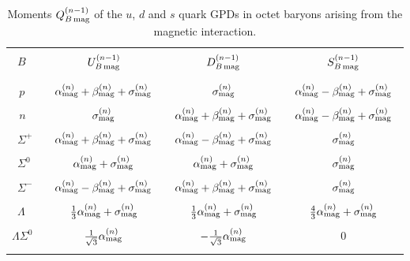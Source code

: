 \documentclass[preprintnumbers,prd,superscriptaddress,preprint]{revtex4-1}
\begin{document}
\begin{table}[b]
\begin{center}
\caption{Moments $Q^{(n-1)}_{B\,\rm mag}$ of the $u$, $d$ and $s$ quark GPDs in octet baryons arising from the magnetic interaction.\\}
\begin{tabular}{l|c|c|c} \hline
& & &
\\
~$B$ &
$U^{(n-1)}_{B\,\rm mag}$ &
$D^{(n-1)}_{B\,\rm mag}$ & 
$S^{(n-1)}_{B\,\rm mag}$ 
\\ 
& & &
\\ \hline
& & &
\\
~\,$p$ &
~$\alpha_{\rm mag}^{(n)}+\beta_{\rm mag}^{(n)}+\sigma_{\rm mag}^{(n)}$~ &
$\sigma_{\rm mag}^{(n)}$ &
~$\alpha_{\rm mag}^{(n)}-\beta_{\rm mag}^{(n)}+\sigma_{\rm mag}^{(n)}$~
\\
& & &
\\
~\,$n$ &
$\sigma_{\rm mag}^{(n)}$ &
~$\alpha_{\rm mag}^{(n)}+\beta_{\rm mag}^{(n)}+\sigma_{\rm mag}^{(n)}$~ &
$\alpha_{\rm mag}^{(n)}-\beta_{\rm mag}^{(n)}+\sigma_{\rm mag}^{(n)}$
\\
& & &
\\
~$\Sigma^+$ &
$\alpha_{\rm mag}^{(n)}+\beta_{\rm mag}^{(n)}+\sigma_{\rm mag}^{(n)}$ &
$\alpha_{\rm mag}^{(n)}-\beta_{\rm mag}^{(n)}+\sigma_{\rm mag}^{(n)}$ &
$\sigma_{\rm mag}^{(n)}$
\\
& & &
\\
~$\Sigma^0$ &
$\alpha_{\rm mag}^{(n)}+\sigma_{\rm mag}^{(n)}$ &
$\alpha_{\rm mag}^{(n)}+\sigma_{\rm mag}^{(n)}$ &
$\sigma_{\rm mag}^{(n)}$ 
\\
& & &
\\
~$\Sigma^-$ &
$\alpha_{\rm mag}^{(n)}-\beta_{\rm mag}^{(n)}+\sigma_{\rm mag}^{(n)}$ &
$\alpha_{\rm mag}^{(n)}+\beta_{\rm mag}^{(n)}+\sigma_{\rm mag}^{(n)}$ &
$\sigma_{\rm mag}^{(n)}$ 
\\
& & &
\\
~$\Lambda$ &
$\frac13\alpha_{\rm mag}^{(n)}+\sigma_{\rm mag}^{(n)}$ &
$\frac13\alpha_{\rm mag}^{(n)}+\sigma_{\rm mag}^{(n)}$ &
$\frac43\alpha_{\rm mag}^{(n)}+\sigma_{\rm mag}^{(n)}$ 
\\
& & &
\\
$\Lambda\Sigma^0$~ &
$\frac{1}{\sqrt3} \alpha_{\rm mag}^{(n)}$ &
$-\frac{1}{\sqrt3}\alpha_{\rm mag}^{(n)}$ &
$0$ 
\\ 
& & &
\\
\hline
\end{tabular}
\label{tab:BB}
\end{center}
\end{table}
\end{document}
